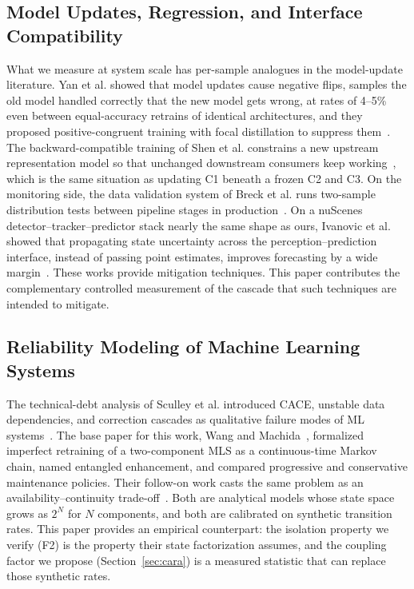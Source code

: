 \documentclass[conference]{IEEEtran}
\begin{document}
\subsection{Model Updates, Regression, and Interface Compatibility}
What we measure at system scale has per-sample analogues in the model-update
literature. Yan et al. showed that model updates cause negative flips, samples
the old model handled correctly that the new model gets wrong, at rates of
4--5\% even between equal-accuracy retrains of identical architectures, and
they proposed positive-congruent training with focal distillation to suppress
them~\cite{yan2021pctraining}. The backward-compatible training of Shen et al.
constrains a new upstream representation model so that unchanged downstream
consumers keep working~\cite{shen2020bct}, which is the same situation as
updating C1 beneath a frozen C2 and C3. On the monitoring side, the data
validation system of Breck et al. runs two-sample distribution tests between
pipeline stages in production~\cite{breck2019data}. On a nuScenes
detector--tracker--predictor stack nearly the same shape as ours, Ivanovic et
al. showed that propagating state uncertainty across the
perception--prediction interface, instead of passing point estimates, improves
forecasting by a wide margin~\cite{ivanovic2022propagating}. These works
provide mitigation techniques. This paper contributes the complementary
controlled measurement of the cascade that such techniques are intended to
mitigate.

\subsection{Reliability Modeling of Machine Learning Systems}
The technical-debt analysis of Sculley et al. introduced CACE, unstable data
dependencies, and correction cascades as qualitative failure modes of ML
systems~\cite{sculley2015hidden}. The base paper for this work, Wang and
Machida~\cite{wang2024compsac}, formalized imperfect retraining of a
two-component MLS as a continuous-time Markov chain, named entangled
enhancement, and compared progressive and conservative maintenance policies.
Their follow-on work casts the same problem as an availability--continuity
trade-off~\cite{wang2025issre}. Both are analytical models whose state space
grows as $2^N$ for $N$ components, and both are calibrated on synthetic
transition rates. This paper provides an empirical counterpart: the isolation
property we verify (F2) is the property their state factorization assumes, and
the coupling factor we propose (Section~\ref{sec:cara}) is a measured statistic
that can replace those synthetic rates.
\end{document}
